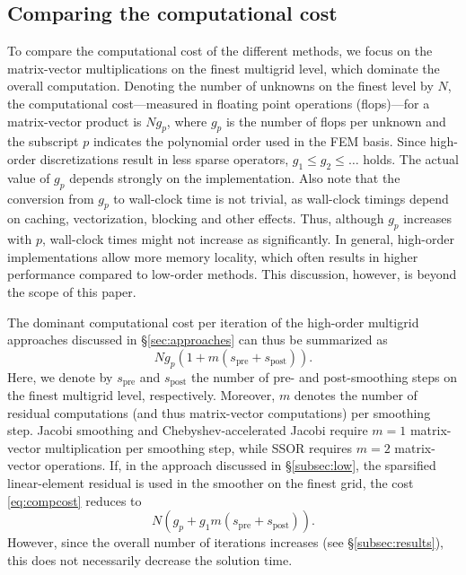 \documentclass[smallcondensed,final]{svjour3}     %
\begin{document}
\subsection{Comparing the computational cost}\label{subsec:complexity}
To compare the computational cost of the different methods, we focus
on the matrix-vector multiplications on the finest multigrid level,
which dominate the overall computation. Denoting the number of
unknowns on the finest level by $N$, the computational cost---measured
in floating point operations (flops)---for a matrix-vector product is
$Ng_p$, where $g_p$ is the number of flops per unknown and the
subscript $p$ indicates the polynomial order used in the FEM basis.
Since high-order discretizations result in less sparse operators,
$g_1\le g_2\le \ldots$ holds. The actual value of $g_p$ depends
strongly on the implementation. Also note that the conversion from
$g_p$ to wall-clock time is not trivial, as wall-clock timings depend
on caching, vectorization, blocking and other effects. Thus,
although $g_p$ increases with $p$, wall-clock
times might not increase as significantly.
In general, high-order implementations allow more memory locality,
which often results in higher performance compared to low-order
methods.
This discussion, however, is beyond the scope of this paper.


The dominant computational cost per iteration of the high-order
multigrid approaches discussed in \S\ref{sec:approaches} can
thus be summarized as
\begin{equation}\label{eq:compcost}
  Ng_p(1+m(s_\text{pre}+s_\text{post})).
\end{equation}
Here, we denote by $s_\text{pre}$ and $s_\text{post}$ the number of
pre- and post-smoothing steps on the finest multigrid level,
respectively. Moreover, $m$ denotes the number of residual
computations (and thus matrix-vector computations) per smoothing step.
Jacobi smoothing and Chebyshev-accelerated Jacobi require $m=1$
matrix-vector multiplication per smoothing step, while SSOR requires
$m=2$ matrix-vector operations. If, in the approach discussed in
\S\ref{subsec:low}, the sparsified linear-element residual is used in the
smoother on the finest grid, the cost \eqref{eq:compcost} reduces to
\begin{equation}\label{eq:compcost2}
  N(g_p + g_1 m(s_\text{pre}+s_\text{post})).
\end{equation}
However, since the overall number of iterations increases (see
\S\ref{subsec:results}), this does not necessarily decrease the
solution time.
\end{document}
